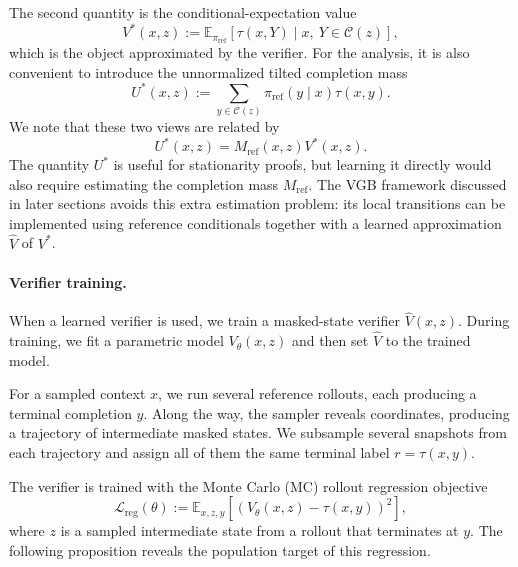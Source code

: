 \documentclass{article}
\numberwithin{theorem}{section}
\numberwithin{proposition}{section}
\numberwithin{corollary}{section}
\numberwithin{lemma}{section}
\numberwithin{conjecture}{section}
\numberwithin{remark}{section}
\numberwithin{definition}{section}
\numberwithin{assumption}{section}
\numberwithin{example}{section}
\newcommand{\calC}{{\mathcal{C}}}
\newcommand{\calL}{{\mathcal{L}}}
\newcommand{\bbE}{\mathbb{E}}
\newcommand{\lbra}[1]{\left[#1\right]}
\newcommand{\sbra}[1]{\left(#1\right)}
\providecommand{\base}{\pi_{\mathrm{ref}}}
\begin{document}
The second quantity is the conditional-expectation value
\begin{equation*}
    V^*(x,z) := \bbE_{\base}\lbra{\tau(x,Y)\mid x,\ Y\in\calC(z)},
\end{equation*}
which is the object approximated by the verifier. For the analysis, it is also convenient to introduce the unnormalized tilted completion mass
\begin{equation*}
    U^*(x,z) := \sum_{y\in\calC(z)}\base(y\mid x)\tau(x,y).
\end{equation*}
We note that these two views are related by
\begin{equation*}
    U^*(x,z)=M_{\mathrm{ref}}(x,z)V^*(x,z).
\end{equation*}
The quantity $U^*$ is useful for stationarity proofs, but learning it directly would also require estimating the completion mass $M_{\mathrm{ref}}$. The VGB framework discussed in later sections avoids this extra estimation problem: its local transitions can be implemented using reference conditionals together with a learned approximation $\widehat V$ of $V^*$.

\paragraph{Verifier training.}
When a learned verifier is used, we train a masked-state verifier \(\widehat V(x,z)\). During training, we fit a parametric model $V_\theta(x,z)$ and then set $\widehat V$ to the trained model.

For a sampled context $x$, we run several reference rollouts, each producing a terminal completion $y$. Along the way, the sampler reveals coordinates, producing a trajectory of intermediate masked states. We subsample several snapshots from each trajectory and assign all of them the same terminal label $r=\tau(x,y)$.

The verifier is trained with the Monte Carlo (MC) rollout regression objective
\begin{equation*}
    \calL_{\mathrm{reg}}(\theta) := \bbE_{x,z,y}\lbra{\sbra{V_\theta(x,z)-\tau(x,y)}^2},
\end{equation*}
where $z$ is a sampled intermediate state from a rollout that terminates at $y$. The following proposition reveals the population target of this regression.
\end{document}
